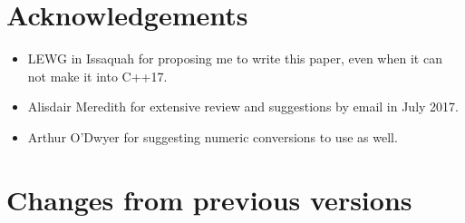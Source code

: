 \documentclass[ebook,11pt,article]{memoir}
\begin{document}
\chapter{Acknowledgements}
\begin{itemize}
\item LEWG in Issaquah for proposing me to write this paper, even when it can not make it into C++17.
\item Alisdair Meredith for extensive review and suggestions by email in July 2017.
\item Arthur O'Dwyer for suggesting numeric conversions to use  as well.
\end{itemize}

\chapter{Changes from previous versions}
\end{document}
